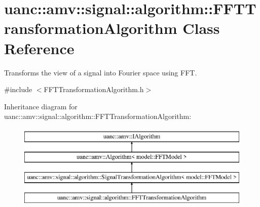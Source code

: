 \hypertarget{classuanc_1_1amv_1_1signal_1_1algorithm_1_1_f_f_t_transformation_algorithm}{}\section{uanc\+:\+:amv\+:\+:signal\+:\+:algorithm\+:\+:F\+F\+T\+Transformation\+Algorithm Class Reference}
\label{classuanc_1_1amv_1_1signal_1_1algorithm_1_1_f_f_t_transformation_algorithm}


Transforms the view of a signal into Fourier space using F\+FT.  




{\ttfamily \#include $<$F\+F\+T\+Transformation\+Algorithm.\+h$>$}

Inheritance diagram for uanc\+:\+:amv\+:\+:signal\+:\+:algorithm\+:\+:F\+F\+T\+Transformation\+Algorithm\+:\begin{figure}[H]
\begin{center}
\leavevmode
\includegraphics[height=4.000000cm]{classuanc_1_1amv_1_1signal_1_1algorithm_1_1_f_f_t_transformation_algorithm}
\end{center}
\end{figure}
